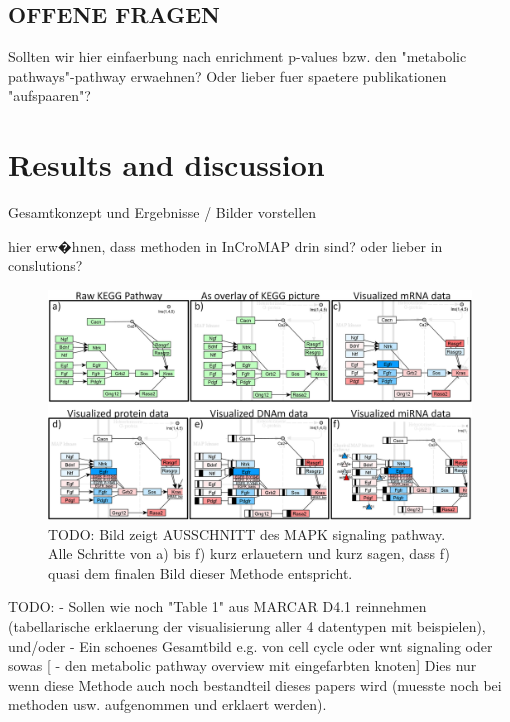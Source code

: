 \documentclass{bioinfo}
\begin{document}
\subsection{OFFENE FRAGEN}
Sollten wir hier einfaerbung nach enrichment p-values bzw. den "metabolic pathways"-pathway erwaehnen? Oder lieber fuer spaetere publikationen "aufspaaren"?




\section{Results and discussion}

Gesamtkonzept und Ergebnisse / Bilder vorstellen

hier erw�hnen, dass methoden in InCroMAP drin sind? oder lieber in conslutions?






\begin{figure}[t]
\centering
\includegraphics[width=1.0\textwidth]{figures/visualization-steps.png}
\caption{
TODO: Bild zeigt AUSSCHNITT des MAPK signaling pathway. Alle Schritte von a) bis f) kurz erlauetern und kurz sagen, dass f) quasi dem finalen Bild dieser Methode entspricht. }\label{fig:visualization_steps}
\end{figure}


TODO:
 - Sollen wie noch "Table 1" aus MARCAR D4.1 reinnehmen (tabellarische erklaerung der visualisierung aller 4 datentypen mit beispielen), und/oder
 - Ein schoenes Gesamtbild e.g. von cell cycle oder wnt signaling oder sowas
[ - den metabolic pathway overview mit eingefarbten knoten] Dies nur wenn diese Methode auch noch bestandteil dieses papers wird (muesste noch bei methoden usw. aufgenommen und erklaert werden).
\end{document}
